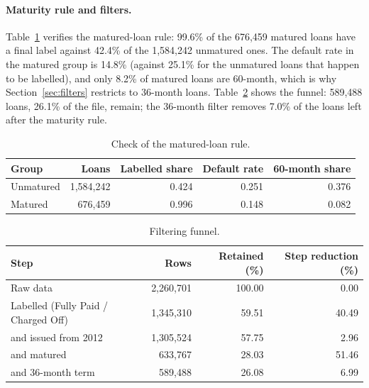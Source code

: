 \paragraph{Maturity rule and filters.} Table~\ref{tab:maturity} verifies the matured-loan rule: 99.6\% of the 676,459 matured loans have a final label against 42.4\% of the 1,584,242 unmatured ones. The default rate in the matured group is 14.8\% (against 25.1\% for the unmatured loans that happen to be labelled), and only 8.2\% of matured loans are 60-month, which is why Section~\ref{sec:filters} restricts to 36-month loans. Table~\ref{tab:funnel} shows the funnel: 589,488 loans, 26.1\% of the file, remain; the 36-month filter removes 7.0\% of the loans left after the maturity rule.

\begin{table}[H]
\centering
\caption{Check of the matured-loan rule.}
\label{tab:maturity}
\begin{tabular}{lrrrr}
\toprule
\textbf{Group} & \textbf{Loans} & \textbf{Labelled share} & \textbf{Default rate} & \textbf{60-month share} \\
\midrule
Unmatured & 1,584,242 & 0.424 & 0.251 & 0.376 \\
Matured & 676,459 & 0.996 & 0.148 & 0.082 \\
\bottomrule
\end{tabular}
\end{table}

\begin{table}[H]
\centering
\caption{Filtering funnel.}
\label{tab:funnel}
\begin{tabular}{lrrr}
\toprule
\textbf{Step} & \textbf{Rows} & \textbf{Retained (\%)} & \textbf{Step reduction (\%)} \\
\midrule
Raw data & 2,260,701 & 100.00 & 0.00 \\
Labelled (Fully Paid / Charged Off) & 1,345,310 & 59.51 & 40.49 \\
\quad and issued from 2012 & 1,305,524 & 57.75 & 2.96 \\
\quad and matured & 633,767 & 28.03 & 51.46 \\
\quad and 36-month term & 589,488 & 26.08 & 6.99 \\
\bottomrule
\end{tabular}
\end{table}

